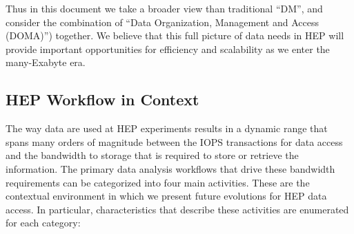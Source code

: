 \documentclass[12pt,a4paper]{article}
\begin{document}
Thus in this document we take a broader view than traditional ``DM'',
and consider the combination of ``Data Organization, Management and
Access (DOMA)'') together. We believe that this full picture of data
needs in HEP will provide important opportunities for efficiency and
scalability as we enter the many-Exabyte era.

\subsection{HEP Workflow in Context}\label{hep-workflow-in-context}

The way data are used at HEP experiments results in a dynamic range that
spans many orders of magnitude between the IOPS transactions for data
access and the bandwidth to storage that is required to store or
retrieve the information. The primary data analysis workflows that drive
these bandwidth requirements can be categorized into four main
activities. These are the contextual environment in which we present
future evolutions for HEP data access. In particular, characteristics
that describe these activities are enumerated for each category:
\end{document}
